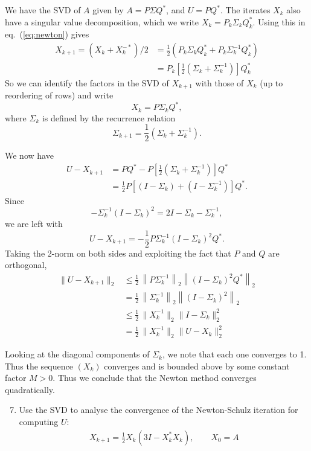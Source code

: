 \documentclass[10pt, A4paper]{article}
\begin{document}
We have the SVD of $A$ given by $A = P\Sigma Q^*$, and $U = PQ^*$.
The iterates $X_k$ also have a singular value decomposition, which we 
write $X_k=P_k \Sigma_k Q_k^*$. Using this in eq.~(\ref{eq:newton}) 
gives
\begin{align*}
	X_{k+1} = (X_k + X_k^{-*})/2 &= \frac{1}{2} (P_k \Sigma_k Q_k^* + 
	P_k \Sigma_k^{-1} Q_k^*)\\
	&= P_k \left[\frac{1}{2}(\Sigma_k + \Sigma_k^{-1})\right] Q_k^*
\end{align*}
So we can identify the factors in the SVD of $X_{k+1}$ with those of 
$X_k$ (up to reordering of rows) and write 
$$X_k = P \Sigma_k Q^*,$$
where $\Sigma_k$ is defined by the recurrence relation
$$
	\Sigma_{k+1} = \frac{1}{2} \left(\Sigma_k + \Sigma_k^{-1} \right).
$$

We now have
\begin{align*}
	U - X_{k+1} &= PQ^* - P\left[\frac{1}{2}
	\left(\Sigma_k + \Sigma_k^{-1}\right)\right] Q^* \\
	&= \frac{1}{2} P \left[\left(I - \Sigma_k\right) + 
	\left(I - \Sigma_k^{-1}\right) \right] Q^*.
\end{align*}
Since
$$
	- \Sigma_k^{-1} (I - \Sigma_k)^2 = 2I -\Sigma_k - \Sigma_k^{-1},
$$
we are left with $$U - X_{k+1} = -\frac{1}{2} P \Sigma_k^{-1} 
\left( I - \Sigma_k \right)^2 Q^*.$$
Taking the 2-norm on both sides and exploiting the fact that $P$ and 
$Q$ are orthogonal,
\begin{align*}
	\| U - X_{k+1} \|_2 &\leq \frac{1}{2}\, \left\| P\Sigma_k^{-1} 
	\right\|_2 \left\| (I - \Sigma_k)^2 Q^*\right\|_2 \\
	&= \frac{1}{2}\, \left\|\Sigma_k^{-1}\right\|_2 \left\| \left( I - 
	\Sigma_k \right)^2 \right\|_2 \\
	&\leq \frac{1}{2}\, \|X_k^{-1}\|_2 \|I - \Sigma_k\|_2^2 \\
	&= \frac{1}{2}\, \|X_k^{-1}\|_2 \|U - X_k\|_2^2
\end{align*}

Looking at the diagonal components of $\Sigma_k$, we note that each one 
converges to 1.
Thus the sequence $(X_k)$ converges and is bounded above by some 
constant factor $M>0$.
Thus we conclude that the Newton method converges quadratically.





\vspace{0.2cm}
\begin{enumerate}
	\setcounter{enumi}{6}
	\item Use the SVD to analyse the convergence of the
	Newton\nobreakdash-Schulz iteration for computing $U$:
	\begin{align*}
		X_{k+1} = \frac{1}{2}X_k(3I - X_k^* X_k), \qquad X_0 = A
	\end{align*}
\end{enumerate}
\end{document}
